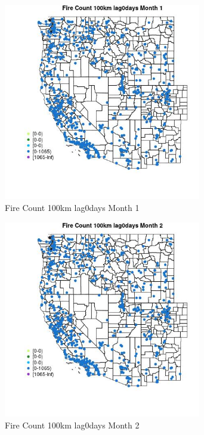 \begin{figure} 
\centering  
\includegraphics[width=0.77\textwidth]{Code_Outputs/Report_ML_input_PM25_Step4_part_f_de_duplicated_aves_prioritize_24hr_obswNAs_MapObsMo1Fire_Count_100km_lag0days.jpg} 
\caption{\label{fig:Report_ML_input_PM25_Step4_part_f_de_duplicated_aves_prioritize_24hr_obswNAsMapObsMo1Fire_Count_100km_lag0days}Fire Count 100km lag0days Month 1} 
\end{figure} 
 

\begin{figure} 
\centering  
\includegraphics[width=0.77\textwidth]{Code_Outputs/Report_ML_input_PM25_Step4_part_f_de_duplicated_aves_prioritize_24hr_obswNAs_MapObsMo2Fire_Count_100km_lag0days.jpg} 
\caption{\label{fig:Report_ML_input_PM25_Step4_part_f_de_duplicated_aves_prioritize_24hr_obswNAsMapObsMo2Fire_Count_100km_lag0days}Fire Count 100km lag0days Month 2} 
\end{figure} 
 

